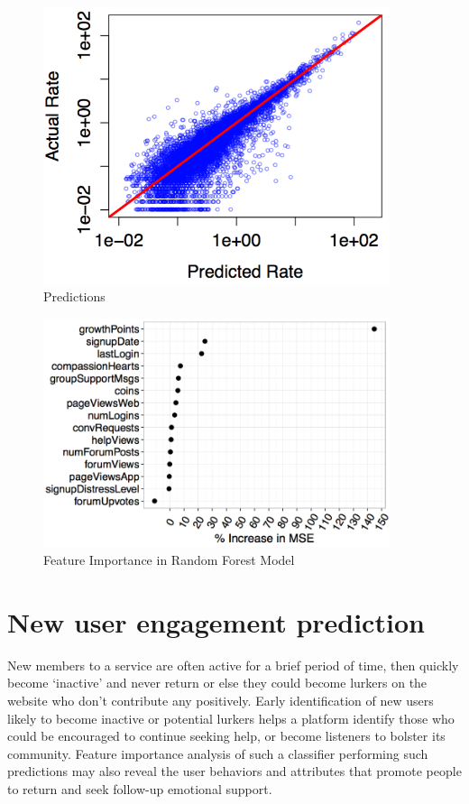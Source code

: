 \begin{figure}
	\centering %
	\includegraphics[width=4in]{Rate.png} %
	\caption{Predictions} 
	\label{fig:5.2}
\end{figure}


\begin{figure}
	\centering %
	\includegraphics[width=4in]{FI.png} %
	\caption{Feature Importance in Random Forest Model} 
	\label{fig:5.3}
\end{figure}

\newpage
\section {New user engagement prediction}

New members to a service are often active for a brief period of time, then quickly become ‘inactive’ and never return or else they could become lurkers on the website who don't contribute any positively. Early identification of new users likely to become inactive or potential lurkers helps a platform identify those who could be encouraged to continue seeking help, or become listeners to bolster its community. Feature importance analysis of such a classifier performing such predictions may also reveal the user behaviors and attributes that promote people to return and seek follow-up emotional support.

